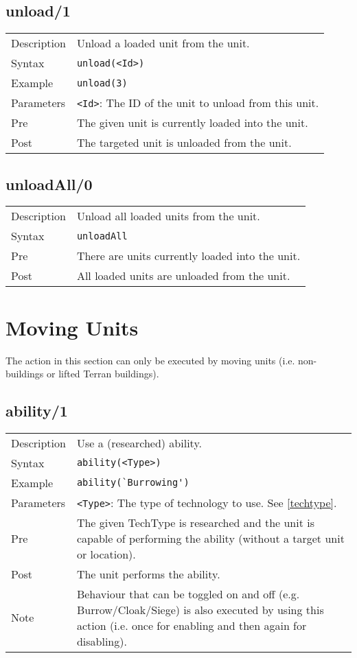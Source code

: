 \subsection{unload/1}
\begin{tabularx}{\textwidth}{lX}
 Description & Unload a loaded unit from the unit. \\
 Syntax & \verb|unload(<Id>)| \\
 Example & \verb|unload(3)| \\
 Parameters & \verb|<Id>|: The ID of the unit to unload from this unit.\\
 Pre & The given unit is currently loaded into the unit. \\
 Post & The targeted unit is unloaded from the unit.
\end{tabularx}

\subsection{unloadAll/0}
\begin{tabularx}{\textwidth}{lX}
 Description & Unload all loaded units from the unit. \\
 Syntax & \verb|unloadAll| \\
 Pre & There are units currently loaded into the unit. \\
 Post & All loaded units are unloaded from the unit.
\end{tabularx}

\section{Moving Units}
The action in this section can only be executed by moving units (i.e. non-buildings or lifted Terran buildings).

\subsection{ability/1}
\begin{tabularx}{\textwidth}{lX}
 Description & Use a (researched) ability. \\
 Syntax & \verb|ability(<Type>)| \\
 Example & \verb|ability(`Burrowing')| \\
 Parameters & \verb|<Type>|: The type of technology to use. See \ref{techtype}. \\
 Pre & The given TechType is researched and the unit is capable of performing the ability (without a target unit or location). \\
 Post & The unit performs the ability. \\
 Note & Behaviour that can be toggled on and off (e.g. Burrow/Cloak/Siege) is also executed by using this action (i.e. once for enabling and then again for disabling).
\end{tabularx}

